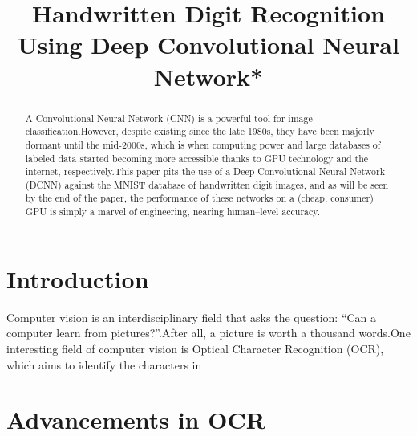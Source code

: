\documentclass[conference]{IEEEtran}
\begin{document}
\title{Handwritten Digit Recognition Using Deep Convolutional Neural Network*}




\author{

\and


\and

}

\maketitle
\begin{abstract}
    A Convolutional Neural Network (CNN) is a powerful tool for image classification.\@ However, despite existing since the late 1980s, they have been majorly dormant until the mid-2000s, which is when computing power and large databases of labeled data started becoming more accessible thanks to GPU technology and the internet, respectively.\@ This paper pits the use of a Deep Convolutional Neural Network (DCNN) against the MNIST database of handwritten digit images, and as will be seen by the end of the paper, the performance of these networks on a (cheap, consumer) GPU is simply a marvel of engineering, nearing human--level accuracy.
\end{abstract}

\section{Introduction}
Computer vision is an interdisciplinary field that asks the question: ``Can a computer learn from pictures?''.\@ After all, a picture is worth a thousand words.\@ One interesting field of computer vision is Optical Character Recognition (OCR), which aims to identify the characters in 
\Blindtext

\section{Advancements in OCR}
\blindtext
\end{document}
